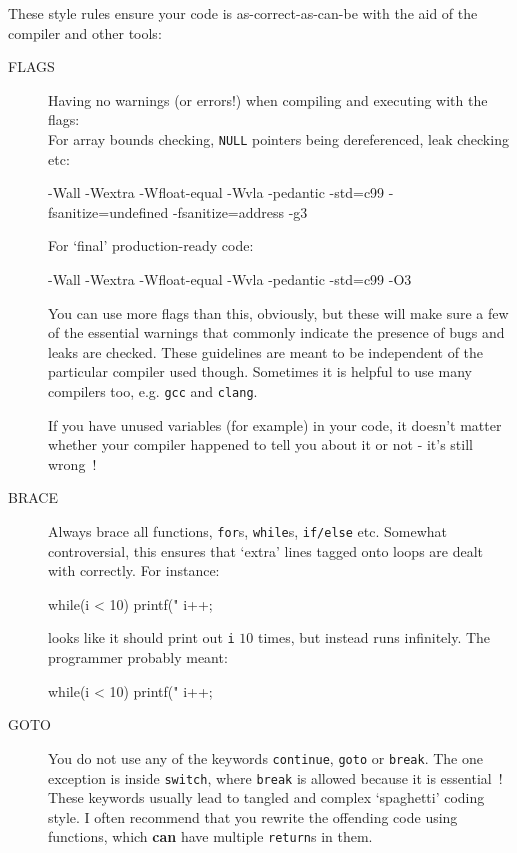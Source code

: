 
These style rules ensure your code is as-correct-as-can-be with the aid
of the compiler and other tools:
\begin{description}
\item[FLAGS] Having no warnings (or errors!) when compiling and executing with the flags:\\
For array bounds checking, \verb^NULL^ pointers being dereferenced, leak checking etc:
\begin{terminaloutput}
-Wall -Wextra -Wfloat-equal -Wvla -pedantic -std=c99
-fsanitize=undefined -fsanitize=address -g3
\end{terminaloutput}
For `final' production-ready code:
\begin{terminaloutput}
-Wall -Wextra -Wfloat-equal -Wvla -pedantic -std=c99
-O3
\end{terminaloutput}

You can use more flags than this, obviously, but these will
make sure a few of the essential warnings that commonly indicate
the presence of bugs and leaks are checked. These guidelines are meant to
be independent of the particular compiler used though.
Sometimes it is helpful to use many compilers too, e.g. \verb^gcc^ and \verb^clang^.

If you have unused variables (for example) in your code, it doesn't matter whether your compiler happened to tell you about it or not - it's still wrong~!

\item[BRACE] Always brace all functions, \verb^for^s, \verb^while^s, \verb^if/else^ etc.
Somewhat controversial, this ensures that `extra' lines tagged onto loops are
dealt with correctly. For instance:
\begin{codesnippet}
while(i < 10)
   printf("%
   i++;
\end{codesnippet}
looks like it should print out \verb^i^ $10$ times, but instead runs infinitely.
The programmer probably meant:
\begin{codesnippet}
while(i < 10){
   printf("%
   i++;
}
\end{codesnippet}

\item[GOTO] You do not use any of the keywords \verb^continue^, \verb^goto^ or \verb^break^. The one exception is inside \verb^switch^, where \verb^break^ is allowed because it is essential~!
These keywords usually lead to tangled and complex `spaghetti' coding style.
I often recommend that you rewrite the offending code using functions, which {\bf can} have multiple \verb^return^s
in them.


\end{description}
